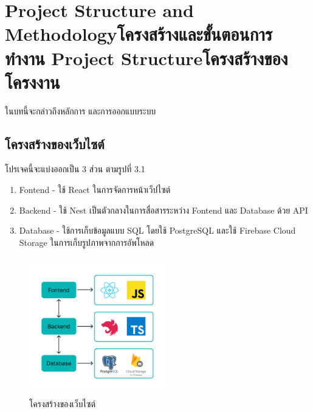 \chapter{\ifproject%
\ifenglish Project Structure and Methodology\else โครงสร้างและขั้นตอนการทำงาน\fi
\else%
\ifenglish Project Structure\else โครงสร้างของโครงงาน\fi
\fi
}

ในบทนี้จะกล่าวถึงหลักการ และการออกแบบระบบ

\makeatletter


\makeatother

\section{โครงสร้างของเว็บไซต์}
โปรเจคนี้จะแบ่งออกเป็น 3 ส่วน ตามรูปที่ 3.1
\begin{enumerate}
  \item Fontend - ใช้ React ในการจัดการหน้าเว็ปไซต์
  \item Backend - ใช้ Nest เป็นตัวกลางในการสื่อสารระหว่าง Fontend และ Database ด้วย API
  \item Database - ใช้การเก็บข้อมูลแบบ SQL โดยใช้ PostgreSQL และใช้ Firebase Cloud Storage ในการเก็บรูปภาพจากการอัพโหลด
\end{enumerate}


\begin{figure}[h]
  \begin{center}
  \includegraphics[width=6cm,height=6cm,keepaspectratio]{SWA.png}
  \end{center}
  \caption[โครงสร้างของเว็บไซต์]{โครงสร้างของเว็บไซต์}
  \label{fig:โครงสร้างของเว็บไซต์}
\end{figure}

